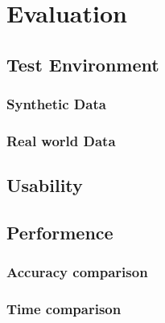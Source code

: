 
\chapter{Evaluation} %


\section{Test Environment}
\subsection{Synthetic Data}
\subsection{Real world Data}
\section{Usability}
\section{Performence}
\subsection{Accuracy comparison}
\subsection{Time comparison}



